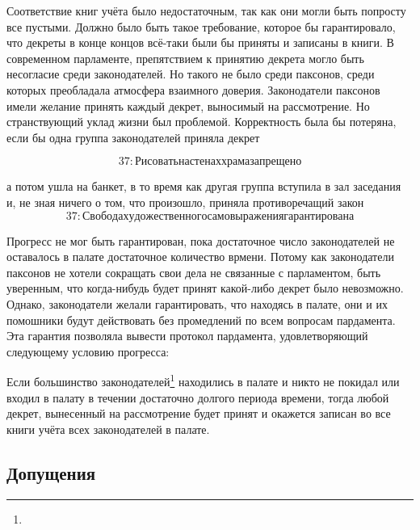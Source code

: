 Соответствие книг учёта было недостаточным, так как они могли быть попросту все пустыми. Должно было быть такое требование, которое бы гарантировало, что декреты в конце концов всё-таки были бы приняты и записаны в книги. В современном парламенте, препятствием к принятию декрета могло быть несогласие среди законодателей. Но такого не было среди паксонов, среди которых преобладала атмосфера взаимного доверия. Законодатели паксонов имели желание принять каждый декрет, выносимый на рассмотрение. Но странствующий уклад жизни был проблемой. Корректность была бы потеряна, если бы одна группа законодателей приняла декрет 

\[ 
    37: Рисовать на стенах храма запрещено 
\]

а потом ушла на банкет, в то время как другая группа вступила в зал заседания и, не зная ничего о том, что произошло, приняла противоречащий закон 
\[
    37: Свобода художественного самовыражения гарантирована 
\]

Прогресс не мог быть гарантирован, пока достаточное число законодателей не оставалось в палате достаточное количество врмени. Потому как законодатели паксонов не хотели сокращать свои дела не связанные с парламентом, быть уверенным, что когда-нибудь будет принят какой-либо декрет было невозможно. Однако, законодатели желали гарантировать, что находясь в палате, они и их помошники будут действовать без промедлений по всем вопросам пардамента. Эта гарантия позволяла вывести протокол пардамента, удовлетворяющий следующему условию прогресса:

    Если большинство законодателей\footnote{} находились в палате и никто не покидал или входил в палату в течении достаточно долгого периода времени, тогда любой декрет, вынесенный на рассмотрение будет принят и окажется записан во все книги учёта всех законодателей в палате.

\subsection{Допущения}
